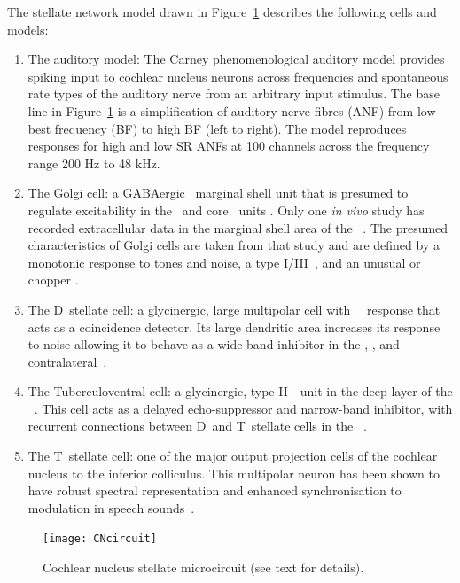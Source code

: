 The stellate network model drawn in Figure~\ref{fig:microcircuit} describes the following cells and models:
\begin{enumerate}
\item The auditory model: The Carney phenomenological auditory model \citep{ZilanyBruceEtAl:2009} provides spiking input to cochlear nucleus neurons across frequencies and spontaneous rate types of the auditory nerve  from an arbitrary input stimulus.  
  The base line in   Figure~\ref{fig:microcircuit} is a simplification of auditory nerve fibres   (ANF) from low best frequency (BF) to high BF (left to right).  
  The model  reproduces responses for high and low SR ANFs at 100 channels across the  frequency range 200 Hz to 48 kHz.
\item The Golgi cell: a {GABA}ergic \VCN~marginal shell unit that is presumed to regulate excitability in the \GCD~and core \VCN~units \citep{FerragamoGoldingEtAl:1998}.
  Only one \textit{in vivo} study has recorded extracellular data in the marginal shell area of the \CN~\citep{GhoshalKim:1997}.
  The presumed characteristics of Golgi cells are  taken from that study and are defined by a monotonic response to tones and noise, a type I\slash III~\EIRA, and an unusual or chopper {\PSTH}.
\item The D~stellate cell: a glycinergic, large multipolar cell with \OnC~\PSTH~response that acts as a coincidence detector.
  Its large dendritic area increases its response to noise allowing it to behave as a wide-band inhibitor in the \VCN, \DCN, and contralateral\CN~\citep{SmithMassieEtAl:2005,ArnottWallaceEtAl:2004,NeedhamPaolini:2007}.
\item The Tuberculoventral cell: a glycinergic, type II~{\EIRA}~unit in the deep layer of the \DCN~\citep{SpirouDavisEtAl:1999}.
  This cell acts as a delayed echo-suppressor and narrow-band inhibitor, with recurrent connections between D~and T~stellate cells in the \VCN~\citep{Alibardi:2006,OertelWickesberg:1993,WickesbergWhitlonEtAl:1991}.
\item The T~stellate cell: one of the major output projection cells of the  cochlear nucleus to the inferior colliculus.
  This multipolar neuron has been shown to have robust spectral representation and enhanced synchronisation to modulation in speech sounds~\citep{BlackburnSachs:1990,KeilsonRichardsEtAl:1997}.
\end{enumerate}

\begin{figure}[htb]
  \centering
  \texttt{[image: CNcircuit]}
  \caption[Cochlear nucleus stellate microcircuit]{Cochlear nucleus stellate microcircuit (see text for details). }
  \label{fig:microcircuit}
\end{figure}



